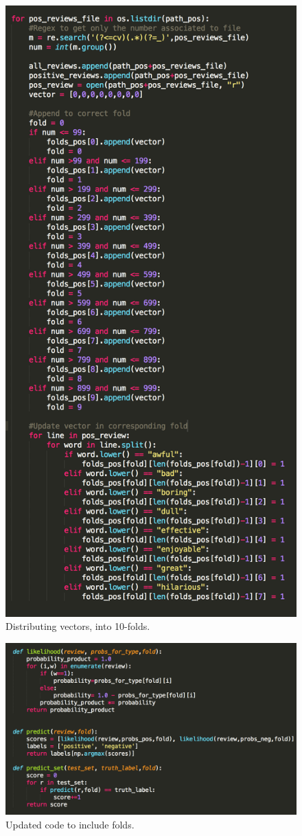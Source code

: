 \documentclass[12pt, letter]{article}
\begin{document}
 \begin{figure}[htb]
  \centering
  \includegraphics[width=0.6 \textwidth]{./figures/folds.png}
  \caption{Distributing vectors, into 10-folds.}
\end{figure}

 \begin{figure}[htb]
  \centering
  \includegraphics[width=0.7 \textwidth]{./figures/predict_fold.png}
  \caption{Updated code to include folds.}
\end{figure}
\end{document}
